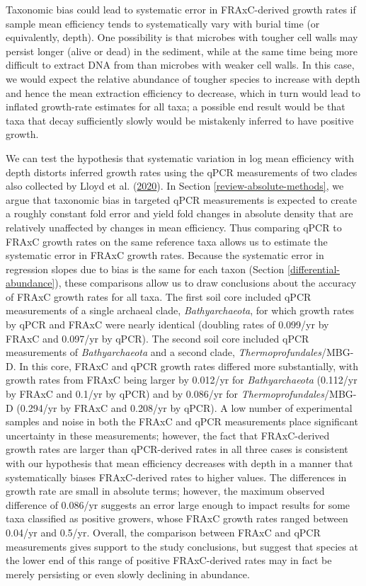 \documentclass[
]{article}
\begin{document}
Taxonomic bias could lead to systematic error in FRAxC-derived growth rates if sample mean efficiency tends to systematically vary with burial time (or equivalently, depth).
One possibility is that microbes with tougher cell walls may persist longer (alive or dead) in the sediment, while at the same time being more difficult to extract DNA from than microbes with weaker cell walls.
In this case, we would expect the relative abundance of tougher species to increase with depth and hence the mean extraction efficiency to decrease, which in turn would lead to inflated growth-rate estimates for all taxa; a possible end result would be that taxa that decay sufficiently slowly would be mistakenly inferred to have positive growth.

We can test the hypothesis that systematic variation in log mean efficiency with depth distorts inferred growth rates using the qPCR measurements of two clades also collected by Lloyd et al. (\protect\hyperlink{ref-lloyd2020evid}{2020}).
In Section \ref{review-absolute-methods}, we argue that taxonomic bias in targeted qPCR measurements is expected to create a roughly constant fold error and yield fold changes in absolute density that are relatively unaffected by changes in mean efficiency.
Thus comparing qPCR to FRAxC growth rates on the same reference taxa allows us to estimate the systematic error in FRAxC growth rates.
Because the systematic error in regression slopes due to bias is the same for each taxon (Section \ref{differential-abundance}), these comparisons allow us to draw conclusions about the accuracy of FRAxC growth rates for all taxa.
The first soil core included qPCR measurements of a single archaeal clade, \emph{Bathyarchaeota}, for which growth rates by qPCR and FRAxC were nearly identical (doubling rates of 0.099/yr by FRAxC and 0.097/yr by qPCR).
The second soil core included qPCR measurements of \emph{Bathyarchaeota} and a second clade, \emph{Thermoprofundales}/MBG-D.
In this core, FRAxC and qPCR growth rates differed more substantially, with growth rates from FRAxC being larger by 0.012/yr for \emph{Bathyarchaeota} (0.112/yr by FRAxC and 0.1/yr by qPCR) and by 0.086/yr for \emph{Thermoprofundales}/MBG-D (0.294/yr by FRAxC and 0.208/yr by qPCR).
A low number of experimental samples and noise in both the FRAxC and qPCR measurements place significant uncertainty in these measurements; however, the fact that FRAxC-derived growth rates are larger than qPCR-derived rates in all three cases is consistent with our hypothesis that mean efficiency decreases with depth in a manner that systematically biases FRAxC-derived rates to higher values.
The differences in growth rate are small in absolute terms; however, the maximum observed difference of 0.086/yr suggests an error large enough to impact results for some taxa classified as positive growers, whose FRAxC growth rates ranged between 0.04/yr and 0.5/yr.
Overall, the comparison between FRAxC and qPCR measurements gives support to the study conclusions, but suggest that species at the lower end of this range of positive FRAxC-derived rates may in fact be merely persisting or even slowly declining in abundance.
\end{document}
